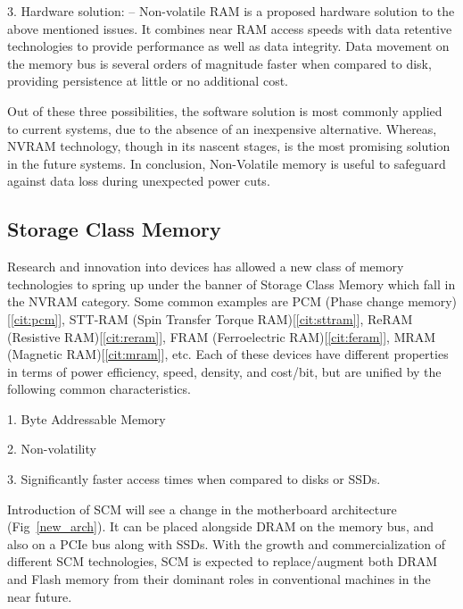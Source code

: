 3. Hardware solution: -- Non-volatile RAM is a proposed hardware solution to the above mentioned issues. It combines near RAM access speeds with data retentive technologies to provide performance as well as data integrity. Data movement on the memory bus is several orders of magnitude faster when compared to disk, providing persistence at little or no additional cost.

Out of these three possibilities, the software solution is most commonly applied to current systems, due to the absence of an inexpensive alternative. Whereas, NVRAM technology, though in its nascent stages, is the most promising solution in the future systems. In conclusion, Non-Volatile memory is useful to safeguard against data loss during unexpected power cuts. 

\subsection{Storage Class Memory}

Research and innovation into devices has allowed a new class of memory technologies to spring up under the banner of Storage Class Memory which fall in the NVRAM category. Some common examples are PCM (Phase change memory)[\ref{cit:pcm}], STT-RAM (Spin Transfer Torque RAM)[\ref{cit:sttram}], ReRAM (Resistive RAM)[\ref{cit:reram}], FRAM (Ferroelectric RAM)[\ref{cit:feram}], MRAM (Magnetic RAM)[\ref{cit:mram}], etc. Each of these devices have different properties in terms of power efficiency, speed, density, and cost/bit, but are unified by the following common characteristics.

1. Byte Addressable Memory

2. Non-volatility

3. Significantly faster access times when compared to disks or SSDs.

Introduction of SCM will see a change in the motherboard architecture (Fig~\ref{new_arch}). It can be placed alongside DRAM on the memory bus, and also on a PCIe bus along with SSDs. With the growth and commercialization of different SCM technologies, SCM is expected to replace/augment both DRAM and Flash memory from their dominant roles in conventional machines in the near future. 

\setlength{\belowcaptionskip}{-10pt}

